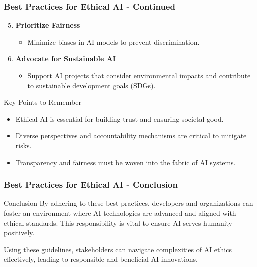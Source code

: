 \documentclass[aspectratio=169]{beamer}
\begin{document}
\begin{frame}[fragile]
    \frametitle{Best Practices for Ethical AI - Continued}
    \begin{enumerate}\setcounter{enumi}{4}
        \item \textbf{Prioritize Fairness}
            \begin{itemize}
                \item Minimize biases in AI models to prevent discrimination.
            \end{itemize}

        \item \textbf{Advocate for Sustainable AI}
            \begin{itemize}
                \item Support AI projects that consider environmental impacts and contribute to sustainable development goals (SDGs).
            \end{itemize}
    \end{enumerate}

    \begin{block}{Key Points to Remember}
        \begin{itemize}
            \item Ethical AI is essential for building trust and ensuring societal good.
            \item Diverse perspectives and accountability mechanisms are critical to mitigate risks.
            \item Transparency and fairness must be woven into the fabric of AI systems.
        \end{itemize}
    \end{block}
\end{frame}

\begin{frame}[fragile]
    \frametitle{Best Practices for Ethical AI - Conclusion}
    \begin{block}{Conclusion}
        By adhering to these best practices, developers and organizations can foster an environment where AI technologies are advanced and aligned with ethical standards. 
        This responsibility is vital to ensure AI serves humanity positively.
    \end{block}
    Using these guidelines, stakeholders can navigate complexities of AI ethics effectively, leading to responsible and beneficial AI innovations.
\end{frame}
\end{document}
